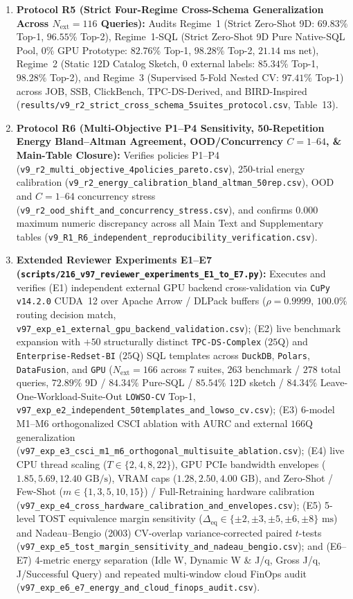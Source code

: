 \documentclass[10pt,a4paper]{article}
\begin{document}
\begin{enumerate}[leftmargin=1.5em,itemsep=2pt]
    \item \textbf{Protocol R5 (Strict Four-Regime Cross-Schema Generalization Across $N_{\text{ext}}=116$ Queries):} Audits Regime~1 (Strict Zero-Shot 9D: $69.83\%$ Top-1, $96.55\%$ Top-2), Regime~1-SQL (Strict Zero-Shot 9D Pure Native-SQL Pool, $0\%$ GPU Prototype: $82.76\%$ Top-1, $98.28\%$ Top-2, $21.14\text{ ms}$ net), Regime~2 (Static 12D Catalog Sketch, $0$ external labels: $85.34\%$ Top-1, $98.28\%$ Top-2), and Regime~3 (Supervised 5-Fold Nested CV: $97.41\%$ Top-1) across JOB, SSB, ClickBench, TPC-DS-Derived, and BIRD-Inspired (\texttt{results/v9\_r2\_strict\_cross\_schema\_5suites\_protocol.csv}, Table~13).
    \item \textbf{Protocol R6 (Multi-Objective P1--P4 Sensitivity, 50-Repetition Energy Bland--Altman Agreement, OOD/Concurrency $C=1\text{--}64$, \& Main-Table Closure):} Verifies policies P1--P4 (\texttt{v9\_r2\_multi\_objective\_4policies\_pareto.csv}), 250-trial energy calibration (\texttt{v9\_r2\_energy\_calibration\_bland\_altman\_50rep.csv}), OOD and $C=1\text{--}64$ concurrency stress (\texttt{v9\_r2\_ood\_shift\_and\_concurrency\_stress.csv}), and confirms $0.000$ maximum numeric discrepancy across all Main Text and Supplementary tables (\texttt{v9\_R1\_R6\_independent\_reproducibility\_verification.csv}).
    \item \textbf{Extended Reviewer Experiments E1--E7 (\texttt{scripts/216\_v97\_reviewer\_experiments\_E1\_to\_E7.py}):} Executes and verifies (E1) independent external GPU backend cross-validation via \texttt{CuPy v14.2.0} CUDA~12 over Apache Arrow / DLPack buffers ($\rho=0.9999$, $100.0\%$ routing decision match, \texttt{v97\_exp\_e1\_external\_gpu\_backend\_validation.csv}); (E2) live benchmark expansion with $+50$ structurally distinct \texttt{TPC-DS-Complex} ($25$Q) and \texttt{Enterprise-Redset-BI} ($25$Q) SQL templates across \texttt{DuckDB}, \texttt{Polars}, \texttt{DataFusion}, and \texttt{GPU} ($N_{\text{ext}}=166$ across 7 suites, $263$ benchmark / $278$ total queries, $72.89\%$ 9D / $84.34\%$ Pure-SQL / $85.54\%$ 12D sketch / $84.34\%$ Leave-One-Workload-Suite-Out \texttt{LOWSO-CV} Top-1, \texttt{v97\_exp\_e2\_independent\_50templates\_and\_lowso\_cv.csv}); (E3) 6-model M1--M6 orthogonalized CSCI ablation with AURC and external $166$Q generalization (\texttt{v97\_exp\_e3\_csci\_m1\_m6\_orthogonal\_multisuite\_ablation.csv}); (E4) live CPU thread scaling ($T\in\{2,4,8,22\}$), GPU PCIe bandwidth envelopes ($1.85, 5.69, 12.40\text{ GB/s}$), VRAM caps ($1.28, 2.50, 4.00\text{ GB}$), and Zero-Shot / Few-Shot ($m\in\{1,3,5,10,15\}$) / Full-Retraining hardware calibration (\texttt{v97\_exp\_e4\_cross\_hardware\_calibration\_and\_envelopes.csv}); (E5) 5-level TOST equivalence margin sensitivity ($\Delta_{\text{eq}}\in\{\pm 2,\pm 3,\pm 5,\pm 6,\pm 8\}\text{ ms}$) and Nadeau--Bengio (2003) CV-overlap variance-corrected paired $t$-tests (\texttt{v97\_exp\_e5\_tost\_margin\_sensitivity\_and\_nadeau\_bengio.csv}); and (E6--E7) 4-metric energy separation (Idle W, Dynamic W \& J/q, Gross J/q, J/Successful Query) and repeated multi-window cloud FinOps audit (\texttt{v97\_exp\_e6\_e7\_energy\_and\_cloud\_finops\_audit.csv}).

\end{enumerate}
\end{document}
